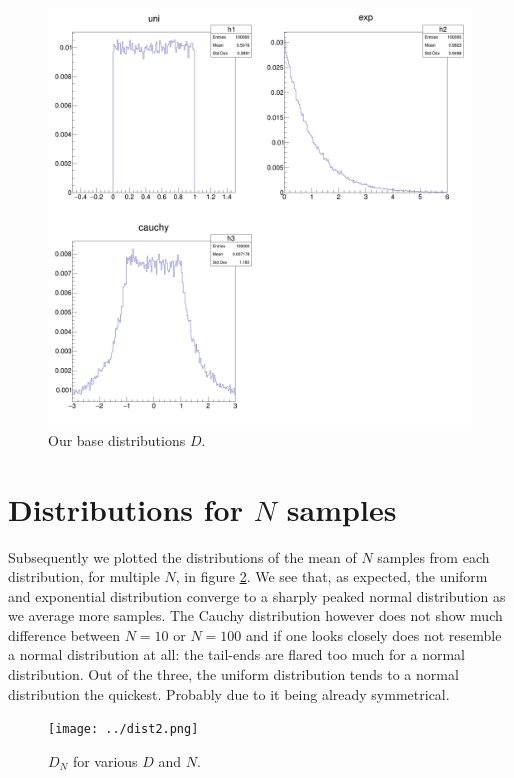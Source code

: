 \documentclass[notitlepage, 12pt, a4paper, twoside, titlepage]{article}
\begin{document}
\begin{figure}[h!]
  \includegraphics[width=\linewidth]{../distributions.png}
  \caption{Our base distributions $D$.}
  \label{fig:dist}
\end{figure}

\section{Distributions for $N$ samples}
Subsequently we plotted the distributions of the mean of $N$ samples from each distribution, for multiple $N$, in figure \ref{fig:dist2}. We see that, as expected, the uniform and exponential distribution converge to a sharply peaked normal distribution as we average more samples.
The Cauchy distribution however does not show much difference between $N = 10$ or $N = 100$ and if one looks closely does not resemble a normal distribution at all: the tail-ends are flared too much for a normal distribution. Out of the three, the uniform distribution tends to a normal distribution the quickest. Probably due to it being already symmetrical.

\begin{figure}[h!]
  \texttt{[image: ../dist2.png]}
  \caption{$D_N$ for various $D$ and $N$.}
  \label{fig:dist2}
\end{figure}
\end{document}
